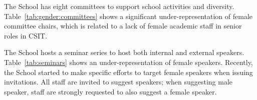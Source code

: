 The School has eight committees to support school activities and diversity. 
Table~\ref{tab:gender:committees} shows 
a significant under-representation of female committee chairs, which is related to a lack of female academic staff in senior roles in CSIT.



The School hosts a seminar series to host both internal and external speakers. Table~\ref{tab:seminars} shows an under-representation of female speakers. Recently, the School started to make specific efforts to target female  speakers when issuing invitations.
All staff are invited to suggest speakers; when suggesting male speaker, staff are strongly requested to also suggest a female speaker.



